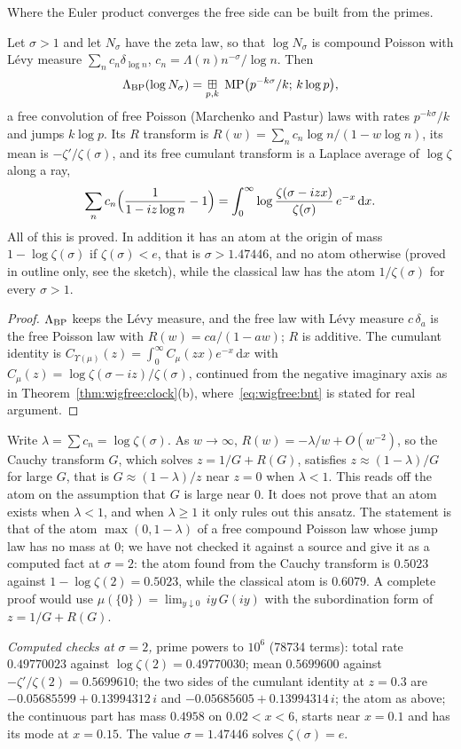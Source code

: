 Where the Euler product converges the free side can be built from the primes.
\begin{theorem}\label{bn:thm:feuler}
Let $\sigma>1$ and let $N_\sigma$ have the zeta law, so that $\log N_\sigma$ is compound Poisson with L\'evy measure $\sum_nc_n\delta_{\log n}$, $c_n=\Lambda(n)n^{-\sigma}/\log n$. Then
\[
\Lambda_{\rm BP}(\log N_\sigma)=\mathop{\boxplus}_{p,k}\;\mathrm{MP}\bigl(p^{-k\sigma}/k;\,k\log p\bigr),
\]
a free convolution of free Poisson (Marchenko and Pastur) laws with rates $p^{-k\sigma}/k$ and jumps $k\log p$. Its $R$ transform is $R(w)=\sum_nc_n\log n/(1-w\log n)$, its mean is $-\zeta'/\zeta(\sigma)$, and its free cumulant transform is a Laplace average of $\log\zeta$ along a ray,
\[
\sum_nc_n\Bigl(\frac1{1-iz\log n}-1\Bigr)=\int_0^\infty\log\frac{\zeta(\sigma-izx)}{\zeta(\sigma)}\,e^{-x}\,\mathrm dx.
\]
All of this is proved. In addition it has an atom at the origin of mass $1-\log\zeta(\sigma)$ if $\zeta(\sigma)<e$, that is $\sigma>1.47446$, and no atom otherwise (proved in outline only, see the sketch), while the classical law has the atom $1/\zeta(\sigma)$ for every $\sigma>1$.
\end{theorem}
\begin{proof}
$\Lambda_{\rm BP}$ keeps the L\'evy measure, and the free law with L\'evy measure $c\,\delta_a$ is the free Poisson law with $R(w)=ca/(1-aw)$; $R$ is additive. The cumulant identity is $C_{\Upsilon(\mu)}(z)=\int_0^\infty C_\mu(zx)e^{-x}\,\mathrm dx$ with $C_\mu(z)=\log\zeta(\sigma-iz)/\zeta(\sigma)$, continued from the negative imaginary axis as in Theorem~\ref{thm:wigfree:clock}(b), where~\eqref{eq:wigfree:bnt} is stated for real argument.
\end{proof}
\begin{remark}
Write $\lambda=\sum c_n=\log\zeta(\sigma)$. As $w\to\infty$, $R(w)=-\lambda/w+O(w^{-2})$, so the Cauchy transform $G$, which solves $z=1/G+R(G)$, satisfies $z\approx(1-\lambda)/G$ for large $G$, that is $G\approx(1-\lambda)/z$ near $z=0$ when $\lambda<1$. This reads off the atom on the assumption that $G$ is large near $0$. It does not prove that an atom exists when $\lambda<1$, and when $\lambda\ge1$ it only rules out this ansatz. The statement is that of the atom $\max(0,1-\lambda)$ of a free compound Poisson law whose jump law has no mass at $0$; we have not checked it against a source %
and give it as a computed fact at $\sigma=2$: the atom found from the Cauchy transform is $0.5023$ against $1-\log\zeta(2)=0.5023$, while the classical atom is $0.6079$. A complete proof would use $\mu(\{0\})=\lim_{y\downarrow0}\,iy\,G(iy)$ with the subordination form of $z=1/G+R(G)$.
\end{remark}
\noindent\textit{Computed checks at $\sigma=2$,} prime powers to $10^6$ (78734 terms): total rate $0.49770023$ against $\log\zeta(2)=0.49770030$; mean $0.5699600$ against $-\zeta'/\zeta(2)=0.5699610$; the two sides of the cumulant identity at $z=0.3$ are $-0.05685599+0.13994312\,i$ and $-0.05685605+0.13994314\,i$; the atom as above; the continuous part has mass $0.4958$ on $0.02<x<6$, starts near $x=0.1$ and has its mode at $x=0.15$. The value $\sigma=1.47446$ solves $\zeta(\sigma)=e$.

